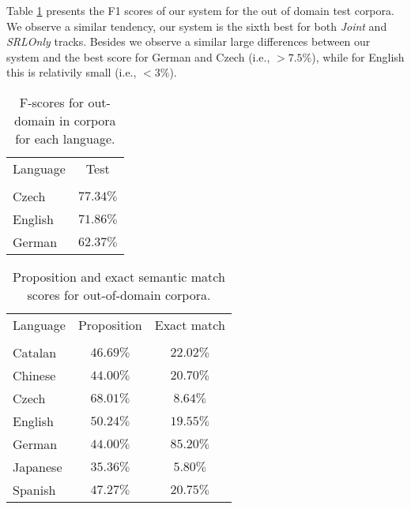 Table \ref{tbl:outresults} presents the F1 scores of our system for the out of 
domain test corpora. We observe a similar tendency, our system is the sixth best 
for both \emph{Joint} and \emph{SRLOnly} tracks. Besides we observe a similar 
large differences between our system and the best score for German and Czech 
(i.e., $>7.5\%$), while for English this is relativily small (i.e., $<3\%$). 

\begin{table}
\begin{center}
\small
\begin{tabular}{|l|c|}\hline
Language        & Test       \\
                &            \\\hline\hline
Czech           & $77.34\%$  \\ 
English         & $71.86\%$  \\
German          & $62.37\%$  \\
\hline
\end{tabular}
\caption{F-scores for out-domain in corpora for each language.}
\label{tbl:outresults}
\normalsize
\end{center}
\end{table}



\begin{table}
\begin{center}
\small
\begin{tabular}{|l|c|c|}\hline
Language        & Proposition         & Exact match \\
                &              &            \\\hline\hline
Catalan         & $46.69\%$ & $22.02\%$  \\
Chinese         & $44.00\%$ & $20.70\%$  \\
Czech           & $68.01\%$ & $8.64\%$  \\
English         & $50.24\%$ & $19.55\%$  \\
German          & $44.00\%$ & $85.20\%$  \\
Japanese        & $35.36\%$ & $5.80\%$  \\
Spanish         & $47.27\%$ & $20.75\%$  \\
\hline
\end{tabular}
\caption{Proposition and exact semantic match scores for out-of-domain corpora.}
\label{tbl:results}
\normalsize
\end{center}
\end{table}



